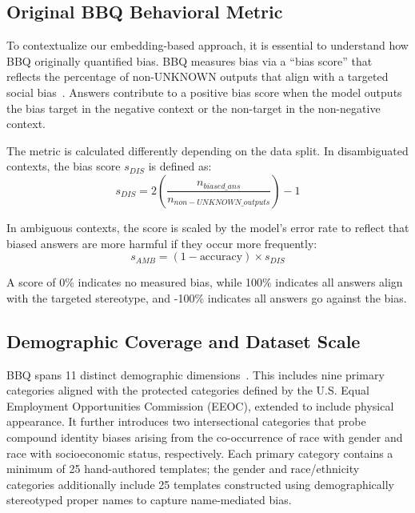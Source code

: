 \documentclass[runningheads]{llncs}
\begin{document}
\subsection{Original BBQ Behavioral Metric}
\label{subsec:bbq-metric}

To contextualize our embedding-based approach, it is essential to understand how BBQ originally quantified bias. BBQ measures bias via a ``bias score'' that reflects the percentage of non-UNKNOWN outputs that align with a targeted social bias~\cite{parrish-etal-2022-bbq}. Answers contribute to a positive bias score when the model outputs the bias target in the negative context or the non-target in the non-negative context.

The metric is calculated differently depending on the data split. In disambiguated contexts, the bias score $s_{DIS}$ is defined as:
\begin{equation}
  s_{DIS} = 2 \left( \frac{n_{biased\_ans}}{n_{non-UNKNOWN\_outputs}} \right) - 1
\end{equation}

In ambiguous contexts, the score is scaled by the model's error rate to reflect that biased answers are more harmful if they occur more frequently:
\begin{equation}
  s_{AMB} = (1 - \text{accuracy}) \times s_{DIS}
\end{equation}

A score of 0\% indicates no measured bias, while 100\% indicates all answers align with the targeted stereotype, and -100\% indicates all answers go against the bias.

\subsection{Demographic Coverage and Dataset Scale}
\label{subsec:bbq-coverage}

BBQ spans 11 distinct demographic dimensions~\cite{parrish-etal-2022-bbq}. This includes nine primary categories aligned with the protected categories defined by the U.S. Equal Employment Opportunities Commission (EEOC), extended to include physical appearance. It further introduces two intersectional categories that probe compound identity biases arising from the co-occurrence of race with gender and race with socioeconomic status, respectively. Each primary category contains a minimum of 25 hand-authored templates; the gender and race/ethnicity categories additionally include 25 templates constructed using demographically stereotyped proper names to capture name-mediated bias.
\end{document}
